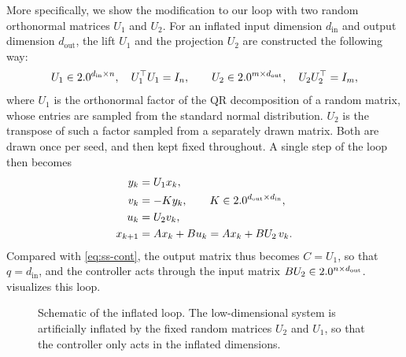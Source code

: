 More specifically, we show the modification to our loop with two random orthonormal matrices $U_1$
and $U_2$. For an inflated input dimension $d_{\mathrm{in}}$ and output dimension $d_{\mathrm{out}}$,
the lift $U_1$ and the projection $U_2$ are constructed the following way:
\begin{equation}
    \label{eq:lifts}
    U_1 \in 2.0^{d_{\mathrm{in}} \times n}, \quad U_1^{\top} U_1 = I_n,
    \qquad
    U_2 \in 2.0^{m \times d_{\mathrm{out}}}, \quad U_2 U_2^{\top} = I_m,
\end{equation}
where $U_1$ is the orthonormal factor of the QR decomposition of a random matrix, whose
entries are sampled from the standard normal distribution. $U_2$ is the transpose of such a factor
sampled from a separately drawn matrix. Both are drawn once per seed, and then kept fixed throughout.
A single step of the loop then becomes
\begin{subequations}
\label{eq:inflated-loop}
\begin{align}
    y_k     &= U_1 x_k , \label{eq:inflated-obs}\\
    v_k     &= -K y_k , \qquad K \in 2.0^{d_{\mathrm{out}} \times d_{\mathrm{in}}} , \label{eq:inflated-ctrl}\\
    u_k     &= U_2 v_k , \label{eq:inflated-act}\\
    x_{k+1} &= A x_k + B u_k = A x_k + B U_2\, v_k . \label{eq:inflated-dyn}
\end{align}
\end{subequations}
Compared with \eqref{eq:ss-cont}, the output matrix thus becomes $C = U_1$, so that $q = d_{\mathrm{in}}$,
and the controller acts through the input matrix $B U_2 \in 2.0^{n \times d_{\mathrm{out}}}$.
 visualizes this loop.

\begin{figure}[htbp]
    \centering
    
    \caption[Schematic of the inflated loop.]{Schematic of the inflated loop. The low-dimensional system is artificially inflated by the fixed random
    matrices $U_2$ and $U_1$, so that the controller only acts in the inflated dimensions.}
    \label{fig:inflated-loop}
\end{figure}


